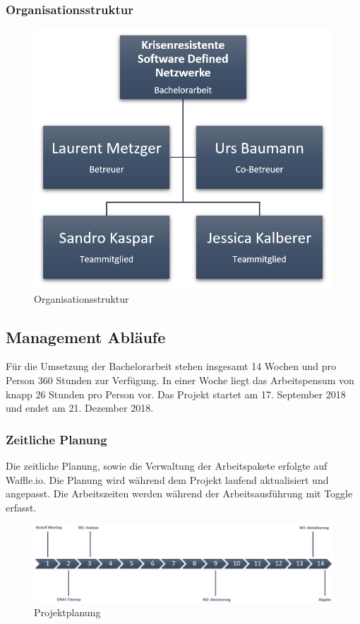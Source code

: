 \subsubsection{Organisationsstruktur}
\begin{figure}[H]
	\centering
	\includegraphics[width=0.7\linewidth]{img/Projektplanung/Organisationsstruktur}
	\caption{Organisationsstruktur}
	\label{fig:Organisationsstruktur}
\end{figure}


\subsection{Management Abläufe}
Für die Umsetzung der Bachelorarbeit stehen insgesamt 14 Wochen und pro Person 360 Stunden zur Verfügung. In einer Woche liegt das Arbeitspensum von knapp 26 Stunden pro Person vor. Das Projekt startet am 17. September 2018 und endet am 21. Dezember 2018.

\subsubsection{Zeitliche Planung}
Die zeitliche Planung, sowie die Verwaltung der Arbeitspakete erfolgte auf Waffle.io. Die Planung wird während dem Projekt laufend aktualisiert und angepasst. Die Arbeitszeiten werden während der Arbeitsausführung mit Toggle erfasst.

\begin{figure}[H]
	\centering
	\includegraphics[width=1\linewidth]{img/Projektplanung/Projektplanung_v1}
	\caption{Projektplanung}
	\label{fig:Projektplanung}
\end{figure} 


